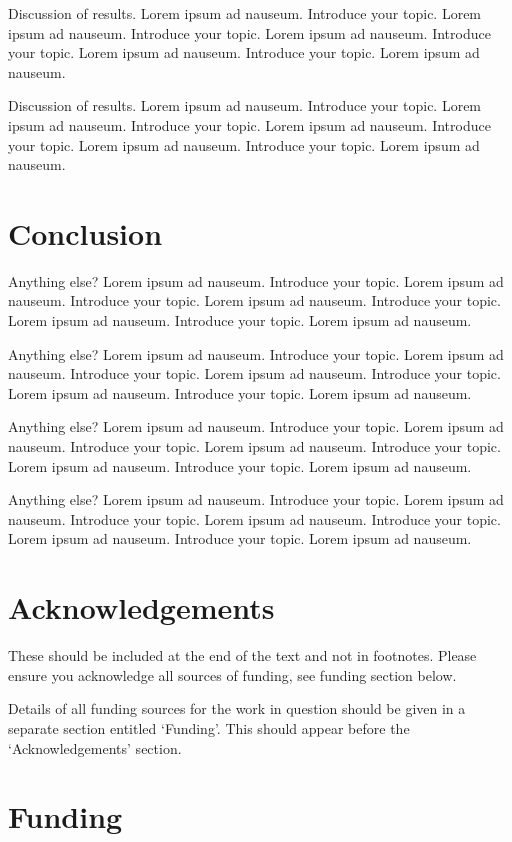 \documentclass{bioinfo}
\begin{document}
Discussion of results. Lorem ipsum ad nauseum. Introduce your topic.
Lorem ipsum ad nauseum. Introduce your topic. Lorem ipsum ad nauseum.
Introduce your topic. Lorem ipsum ad nauseum. Introduce your topic.
Lorem ipsum ad nauseum.

Discussion of results. Lorem ipsum ad nauseum. Introduce your topic.
Lorem ipsum ad nauseum. Introduce your topic. Lorem ipsum ad nauseum.
Introduce your topic. Lorem ipsum ad nauseum. Introduce your topic.
Lorem ipsum ad nauseum.

\section{Conclusion}

Anything else? Lorem ipsum ad nauseum. Introduce your topic. Lorem ipsum
ad nauseum. Introduce your topic. Lorem ipsum ad nauseum. Introduce your
topic. Lorem ipsum ad nauseum. Introduce your topic. Lorem ipsum ad
nauseum.

Anything else? Lorem ipsum ad nauseum. Introduce your topic. Lorem ipsum
ad nauseum. Introduce your topic. Lorem ipsum ad nauseum. Introduce your
topic. Lorem ipsum ad nauseum. Introduce your topic. Lorem ipsum ad
nauseum.

Anything else? Lorem ipsum ad nauseum. Introduce your topic. Lorem ipsum
ad nauseum. Introduce your topic. Lorem ipsum ad nauseum. Introduce your
topic. Lorem ipsum ad nauseum. Introduce your topic. Lorem ipsum ad
nauseum.

Anything else? Lorem ipsum ad nauseum. Introduce your topic. Lorem ipsum
ad nauseum. Introduce your topic. Lorem ipsum ad nauseum. Introduce your
topic. Lorem ipsum ad nauseum. Introduce your topic. Lorem ipsum ad
nauseum.

\section*{Acknowledgements}

These should be included at the end of the text and not in footnotes.
Please ensure you acknowledge all sources of funding, see funding
section below.

Details of all funding sources for the work in question should be given
in a separate section entitled `Funding'. This should appear before the
`Acknowledgements' section.

\section*{Funding}
\end{document}
